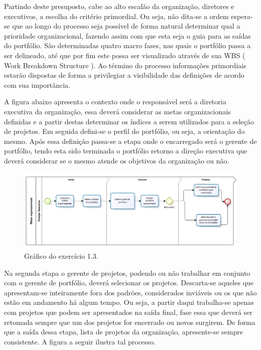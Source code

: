 \documentclass[12pt,a4paper,ruledheader,tocpage=prefix,floatnumber=continuous,pagestart=folhaderosto,font=times]{abnt}
\begin{document}
Partindo deste presuposto, cabe ao alto escalão da organização, diretores e executivos, a escolha do critério primordial. Ou seja, não dita-se a ordem 
espera-se que ao longo do processo seja possível de forma natural determinar qual a prioridade organizacional, fazendo assim com que esta seja o guia para 
as saídas do portfólio. São determinadas quatro macro fases, nas quais o portfólio passa a ser delineado, até que por fim este possa ser visualizado através 
de sua WBS ( Work Breakdown Structure ). Ao término do processo informações primordiais estarão dispostas de forma a privilegiar a visibilidade das 
definições de acordo com sua importância.

A figura abaixo apresenta o contexto onde o responsável será a diretoria executiva da organização, essa deverá considerar as metas organizacionais 
definidas e a partir destas determinar os índices a serem utilizados para a seleção de projetos. Em seguida defini-se o perfil do portfólio, ou seja, a 
orientação do mesmo. Após essa definição passa-se a etapa onde o encarregado será o gerente de portfólio, tendo esta sido terminada o portfólio retorno 
a direção executiva que deverá considerar se o mesmo atende os objetivos da organização ou não.

\begin{figure}[H]
\centering
\includegraphics[width=.9\textwidth]{DirecaoExecutiva.png}
\caption{Gráfico do exercício 1.3.}
\end{figure}

Na segunda etapa o gerente de projetos, podendo ou não trabalhar em conjunto com o gerente de portfólio, deverá selecionar os projetos. Descarta-se 
aqueles que apresentam-se inteiramente fora dos padrões, considerados inviáveis ou os que não estão em andamento há algum tempo. Ou seja, a partir daqui 
trabalha-se apenas com projetos que podem ser apresentados na saída final, fase essa que deverá ser retomada sempre que um dos projetos for encerrado ou 
novos surgirem. De forma que a saída dessa etapa, lista de projetos da organização, apresente-se sempre consistente. A figura a seguir ilustra tal 
processo.
\end{document}
